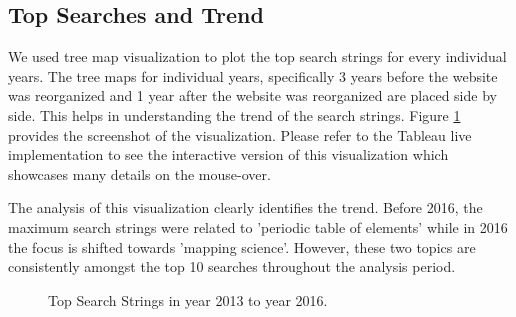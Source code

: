 \subsection{Top Searches and Trend} \label{viztopsearches}
We used tree map visualization to plot the top search strings for every
individual years. The tree maps for individual years, specifically 3 years
before the website was reorganized and 1 year after the website was
reorganized are placed side by side. This helps in understanding the trend of
 the search strings. Figure \ref{fig:topsearches} provides the screenshot of
 the visualization. Please refer to the Tableau live implementation to see
 the interactive version of this visualization which showcases many details
 on the mouse-over.

The analysis of this visualization clearly identifies the trend. Before 2016,
 the maximum search strings were related to 'periodic table of elements'
 while in 2016 the focus is shifted towards 'mapping science'. However, these
   two topics are consistently amongst the top 10 searches throughout the
   analysis period.

\begin{figure}
\centering
{}
\caption{Top Search Strings in year 2013 to year 2016.}
\label{fig:topsearches}
\end{figure}
